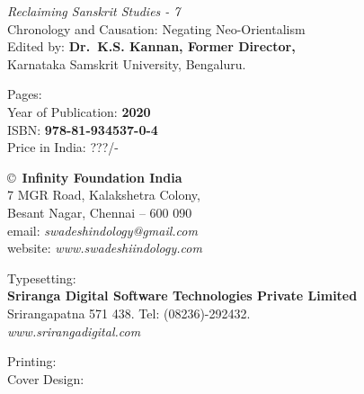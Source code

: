 \thispagestyle{empty}

\noindent
{\fontsize{9}{11}\selectfont\sl Reclaiming Sanskrit Studies - 7}\\
Chronology and Causation: Negating Neo-Orientalism\\
Edited by: {\bf Dr.\ K.S. Kannan, Former Director,}\\
Karnataka Samskrit University, Bengaluru.\\
\vfill

\noindent
Pages: {\bf\pageref{bookend}}\\
Year of Publication: {\bf 2020}\\
ISBN: {\bf 978-81-934537-0-4}\\
Price in India: ???/-
\vfill

\noindent
\copyright\ {\bf Infinity Foundation India}\\ 
7 MGR Road, Kalakshetra Colony,\\ 
Besant Nagar, Chennai -- 600 090\\
email: {\sl swadeshindology@gmail.com}\\
website: {\sl www.swadeshiindology.com} 
\vfill

\noindent
Typesetting:\\ 
{\bf Sriranga Digital Software Technologies Private Limited}\\ 
Srirangapatna 571 438. Tel: (08236)-292432.\\
{\sl www.srirangadigital.com}
\vfill

\noindent
Printing:\\

\noindent
Cover Design:\\ 
